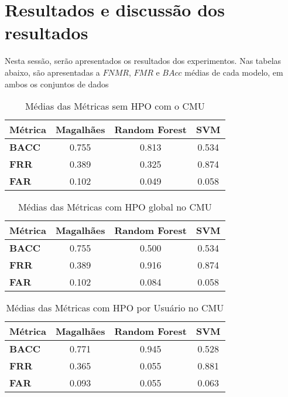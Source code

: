 \section{Resultados e discussão dos resultados}\label{sec:resultados}

Nesta sessão, serão apresentados os resultados dos experimentos. Nas tabelas abaixo, são apresentadas a $FNMR$, $FMR$ e $BAcc$ médias de cada modelo, em ambos os conjuntos de dados

\begin{table}[htbp]
\centering
\caption{Médias das Métricas sem HPO com o CMU}
\label{tab:cmu_sem_hpo}
\begin{tabular}{|l|c|c|c|}
\hline
\textbf{Métrica} & 
\textbf{Magalhães} & 
\textbf{Random Forest} & 
\textbf{SVM} \\
\hline
\textbf{BACC} & 
0.755 & 
0.813 & 
0.534 \\
\hline
\textbf{FRR} & 
0.389 & 
0.325 & 
0.874 \\
\hline
\textbf{FAR} & 
0.102 & 
0.049 & 
0.058 \\
\hline
\end{tabular}
\end{table}

\begin{table}[htbp]
\centering
\caption{Médias das Métricas com HPO global no CMU}
\label{tab:cmu_hpo_global}
\begin{tabular}{|l|c|c|c|}
\hline
\textbf{Métrica} & 
\textbf{Magalhães} & 
\textbf{Random Forest} & 
\textbf{SVM} \\
\hline
\textbf{BACC} & 
0.755 & 
0.500 & 
0.534 \\
\hline
\textbf{FRR} & 
0.389 & 
0.916 & 
0.874 \\
\hline
\textbf{FAR} & 
0.102 & 
0.084 & 
0.058 \\
\hline
\end{tabular}
\end{table}

\begin{table}[htbp]
\centering
\caption{Médias das Métricas com HPO por Usuário no CMU}
\label{tab:cmu_hpo_usuario}
\begin{tabular}{|l|c|c|c|}
\hline
\textbf{Métrica} & 
\textbf{Magalhães} & 
\textbf{Random Forest} & 
\textbf{SVM} \\
\hline
\textbf{BACC} & 
0.771 & 
0.945 & 
0.528 \\
\hline
\textbf{FRR} & 
0.365 & 
0.055 & 
0.881 \\
\hline
\textbf{FAR} & 
0.093 & 
0.055 & 
0.063 \\
\hline
\end{tabular}
\end{table}

